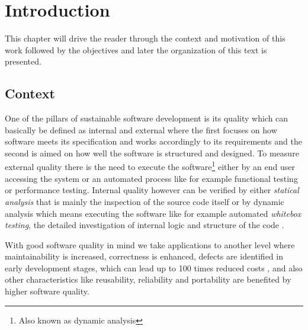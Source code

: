 \chapter{Introduction}
 This chapter will drive the reader through the context and motivation of this work followed by the objectives and later the organization of this text is presented.  
 

\section{Context}

One of the pillars of sustainable software development is its quality which can basically be defined as internal and external where the first focuses on how software meets its specification and works accordingly to its requirements and the second is aimed on how well the software is structured and designed. To measure external quality there is the need to execute the software\footnote{Also known as dynamic analysis} either by an end user accessing the system or an automated process like for example functional testing or performance testing. Internal quality however can be verified by either \emph{statical analysis} that is mainly the inspection of the source code itself or by dynamic analysis which means executing the software like for example automated \emph{whitebox testing}, the detailed investigation of internal logic and structure of the code \citep{Khan 2012}.   

With good software quality in mind we take applications to another level where maintainability is increased, correctness is enhanced, defects are identified in early development stages, which can lead up to 100 times reduced costs \citep{Beohm 2001}, and also other characteristics like reusability, reliability and portability are benefited by higher software quality.  

